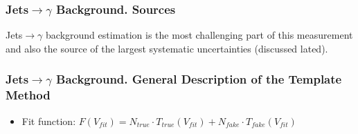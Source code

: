 \begin{frame}\frametitle{Jets$\rightarrow \gamma$ Background. Sources}
  \scriptsize
  Jets$\rightarrow \gamma$ background estimation is the most challenging part of this measurement and also the source of the largest systematic uncertainties (discussed lated).
\end{frame}

\begin{frame}\frametitle{Jets$\rightarrow \gamma$ Background. General Description of the Template Method}
  \scriptsize
  \begin{itemize}
    \item Fit function: $F(V_{fit})=N_{true} \cdot T_{true}(V_{fit}) + N_{fake} \cdot T_{fake}(V_{fit})$
  \end{itemize}
\end{frame}

